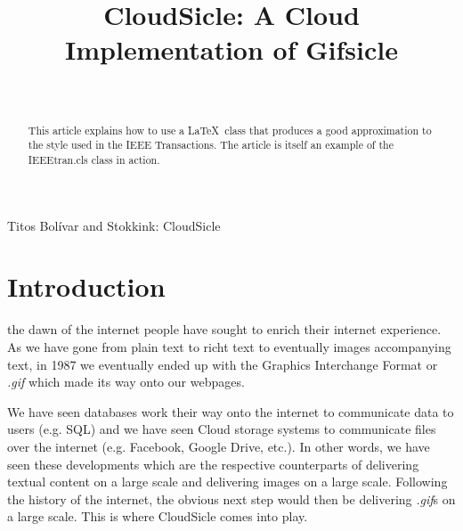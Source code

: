 \documentclass[twocolumn,twoside]{IEEEtran}
\begin{document}
\title{CloudSicle: A Cloud Implementation of Gifsicle}

\author{
\phantom{Hello :D}
\\
}

{Titos Bol\'{i}var and Stokkink: CloudSicle}

\maketitle

\begin{abstract}
This article explains how to use a \LaTeX\ class that produces a good
approximation to the style used in the IEEE Transactions.  The article
is itself an example of the IEEEtran.cls class in action.
\end{abstract}

\section{Introduction}
\label{sec:intro}
 the dawn of the internet people have sought to 
enrich their internet experience. As we have gone from plain 
text to richt text to eventually images accompanying text, in 1987 we 
eventually ended up with the Graphics Interchange Format or \textit{.gif} which
made its way onto our webpages.

We have seen databases work their way onto the internet to communicate
data to users (e.g. SQL) and we have seen Cloud storage systems to communicate files
over the internet (e.g. Facebook, Google Drive, etc.). In other words, we have seen
these developments which are the respective counterparts of delivering
textual content on a large scale and delivering images on a large scale.
Following the history of the internet, the obvious next step would then be
delivering \textit{.gif}s on a large scale. This is where CloudSicle comes into play.
\end{document}

